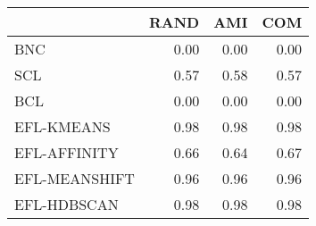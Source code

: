 \begin{tabular}{lrrr}
\toprule
 & RAND & AMI & COM \\
\midrule
BNC & 0.00 & 0.00 & 0.00 \\
SCL & 0.57 & 0.58 & 0.57 \\
BCL & 0.00 & 0.00 & 0.00 \\
EFL-KMEANS & 0.98 & 0.98 & 0.98 \\
EFL-AFFINITY & 0.66 & 0.64 & 0.67 \\
EFL-MEANSHIFT & 0.96 & 0.96 & 0.96 \\
EFL-HDBSCAN & 0.98 & 0.98 & 0.98 \\
\bottomrule
\end{tabular}
